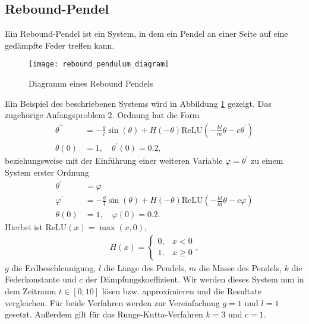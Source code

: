 \subsection{Rebound-Pendel}
\label{subsec:rebound-Pendel}
Ein Rebound-Pendel ist ein System, in dem ein Pendel an einer Seite auf eine gedämpfte Feder treffen kann.
\begin{figure}
       \centering
       \texttt{[image: rebound\_pendulum\_diagram]}
       \caption{Diagramm eines Rebound Pendels\cite[6]{flamantSolvingDifferentialEquations2020}}
       \label{fig:rebound_pendulum_diagram}
\end{figure}
Ein Beispiel des beschriebenen Systems wird in Abbildung \ref{fig:rebound_pendulum_diagram} gezeigt. Das zugehörige
Anfangsproblem 2. Ordnung hat die Form
\begin{align*}
       \theta^{\prime \prime} &= - \frac{g}{l} \sin(\theta) + H(-\theta)
       \text{ReLU}(-\frac{kl}{m}\theta - c \theta^{\prime})\\
       \theta(0) &= 1, \quad \theta^{\prime}(0)=0.2,
\end{align*}
beziehungsweise mit der Einführung einer weiteren Variable $\varphi=\theta^{\prime}$ zu einem System erster Ordnung
\begin{align}
       \theta^{\prime} &= \varphi \nonumber \\
       \varphi^{\prime} &= - \frac{g}{l} \sin(\theta) + H(-\theta)
       \text{ReLU}(-\frac{kl}{m}\theta - c \varphi) \label{rebound-pendulum}\\
       \theta(0) &= 1, \quad \varphi(0)=0.2. \nonumber
\end{align}
Hierbei ist $\text{ReLU}(x)= \max(x, 0)$,
\begin{align*}
       H(x) =
       \begin{cases}
              0, &x<0 \\
              1, &x \geq 0
       \end{cases},
\end{align*}
$g$ die Erdbeschleunigung, $l$ die Länge des Pendels, $m$ die Masse des Pendels, $k$ die Federkonstante und $c$ der
Dämpfungskoeffizient. Wir werden dieses System nun in dem Zeitraum $t \in [0, 10]$ lösen bzw. approximieren und die
Resultate vergleichen. Für beide Verfahren werden zur Vereinfachung $g=1$ und $l=1$ gesetzt. Außerdem gilt für das
Runge-Kutta-Verfahren $k=3$ und $c=1$.

